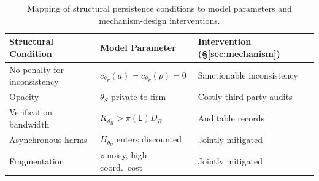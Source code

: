 \begin{table}[t]
\centering
\scriptsize
\setlength{\tabcolsep}{3pt}
\renewcommand{\arraystretch}{1.2}
\begin{tabular}{@{}p{2.7cm}p{2.2cm}p{2.7cm}@{}}
\toprule
\textbf{Structural Condition} & \textbf{Model Parameter} & \textbf{Intervention (\S\ref{sec:mechanism})} \\
\midrule
No penalty for inconsistency & $c_{\theta_F}(a)=c_{\theta_F}(p)=0$ & Sanctionable inconsistency \\
Opacity & $\theta_S$ private to firm & Costly third-party audits \\
Verification bandwidth & $K_{\theta_R}>\pi(\mathsf{L})D_R$ & Auditable records \\
Asynchronous harms & $H_{\theta_U}$ enters discounted & Jointly mitigated \\
Fragmentation & $z$ noisy, high coord.\ cost & Jointly mitigated \\
\bottomrule
\end{tabular}
\caption{Mapping of structural persistence conditions to model parameters and mechanism-design interventions.}
\label{tab:condition-map}
\end{table}
